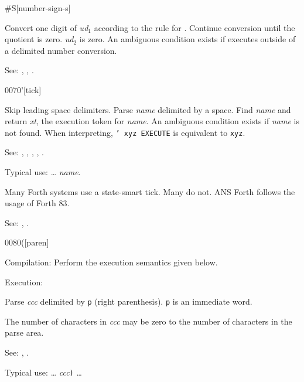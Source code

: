 \begin{newword}[numS]{50}{\#S}[number-sign-s]

	Convert one digit of \emph{ud}$_1$ according to the rule for
	. Continue conversion until the quotient is zero.
	\emph{ud}$_2$ is zero. An ambiguous condition exists if
	 executes outside of a  
	delimited number conversion.

\item[See:]
	,
	,
	.
\end{newword}


\begin{newword}{0070}{'}[tick]

	Skip leading space delimiters. Parse \emph{name} delimited by
	a space. Find \emph{name} and return \emph{xt}, the execution
	token for \emph{name}. An ambiguous condition exists if
	\emph{name} is not found. When interpreting,
	\texttt{' xyz EXECUTE} is equivalent to \texttt{xyz}.

\item[See:]
	,
	,
	,
	,
	.

	\begin{rationale} %
		Typical use: {\ldots}  \emph{name}.

		Many Forth systems use a state-smart tick. Many do not.
		ANS Forth follows the usage of Forth 83.

		See:
			,
			.
	\end{rationale}
\end{newword}


\begin{newword*}[p]{0080}{(}[paren]
\item[Compilation:]
	Perform the execution semantics given below.

\item[Execution:]

	Parse \emph{ccc} delimited by \texttt{p} (right parenthesis).
	\texttt{p} is an immediate word.

	The number of characters in \emph{ccc} may be zero to the
	number of characters in the parse area.

\item[See:]	
	,
	.

	\begin{rationale} %
		Typical use: {\ldots}  \emph{ccc}\texttt{)} {\ldots}
	\end{rationale}
\end{newword*}



